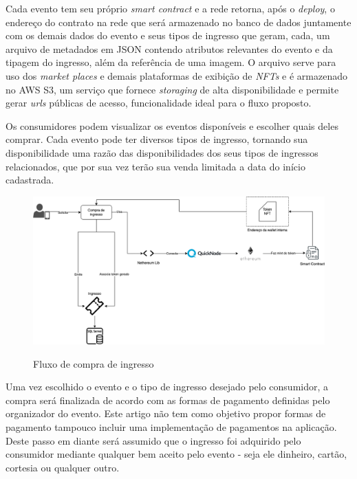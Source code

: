 {Cada evento tem seu próprio \textit{smart contract} e a rede retorna, após o \textit{deploy}, o endereço do contrato na rede que será armazenado no banco de dados juntamente com os demais dados do evento e seus tipos de ingresso que geram, cada, um arquivo de metadados em JSON contendo atributos relevantes do evento e da tipagem do ingresso, além da referência de uma imagem. O arquivo serve para uso dos \textit{market places} e demais plataformas de exibição de \textit{NFTs} e é armazenado no AWS S3, um serviço que fornece \textit{storaging} de alta disponibilidade e permite gerar \textit{urls} públicas de acesso, funcionalidade ideal para o fluxo proposto.


Os consumidores podem visualizar os eventos disponíveis e escolher quais deles comprar. Cada evento pode ter diversos tipos de ingresso, tornando sua disponibilidade uma razão das disponibilidades dos seus tipos de ingressos relacionados, que por sua vez terão sua venda limitada a data do início cadastrada.


\begin{figure}[ht]
    \centering
    \caption{Fluxo de compra de ingresso}
    \includegraphics[scale=0.37]{figuras/ticket-buy.png}
    \label{fig:ticket-buy}
\end{figure}

Uma vez escolhido o evento e o tipo de ingresso desejado pelo consumidor, a compra será finalizada de acordo com as formas de pagamento definidas pelo organizador do evento. Este artigo não tem como objetivo propor formas de pagamento tampouco incluir uma implementação de pagamentos na aplicação. Deste passo em diante será assumido que o ingresso foi adquirido pelo consumidor mediante qualquer bem aceito pelo evento - seja ele dinheiro, cartão, cortesia ou qualquer outro.

}
